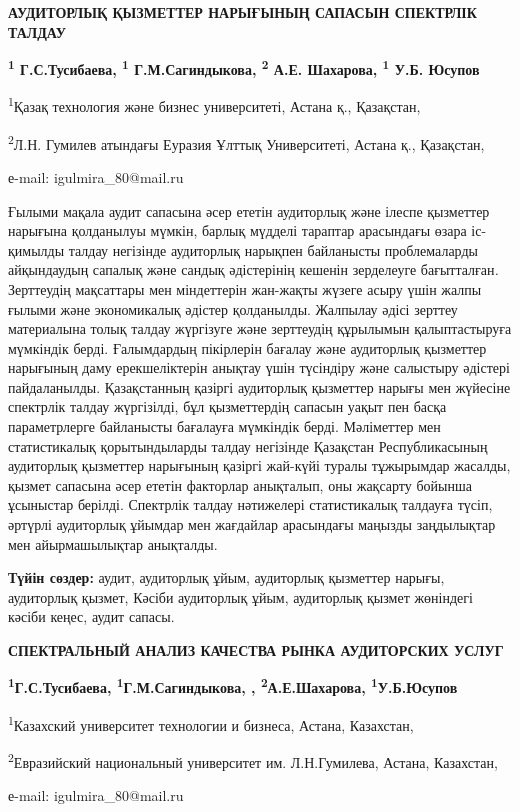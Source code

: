 \begin{articleheader}

{\bfseries АУДИТОРЛЫҚ ҚЫЗМЕТТЕР НАРЫҒЫНЫҢ САПАСЫН СПЕКТРЛІК ТАЛДАУ}

{\bfseries \textsuperscript{1} Г.С.Тусибаева\textsuperscript{\envelope},
\textsuperscript{1} Г.М.Сагиндыкова, \textsuperscript{2} А.Е. Шахарова,
\textsuperscript{1} У.Б. Юсупов}
\end{articleheader}
\begin{affiliation}

\textsuperscript{1}Қазақ технология және бизнес университеті, Астана қ.,
Қазақстан,

\textsuperscript{2}Л.Н. Гумилев атындағы Еуразия Ұлттық Университеті,
Астана қ., Қазақстан,

е-mail: igulmira\_80@mail.ru
\end{affiliation}

Ғылыми мақала аудит сапасына әсер ететін аудиторлық және ілеспе
қызметтер нарығына қолданылуы мүмкін, барлық мүдделі тараптар арасындағы
өзара іс-қимылды талдау негізінде аудиторлық нарықпен байланысты
проблемаларды айқындаудың сапалық және сандық әдістерінің кешенін
зерделеуге бағытталған\emph{.} Зерттеудің мақсаттары мен міндеттерін
жан-жақты жүзеге асыру үшін жалпы ғылыми және экономикалық әдістер
қолданылды. Жалпылау әдісі зерттеу материалына толық талдау жүргізуге
және зерттеудің құрылымын қалыптастыруға мүмкіндік берді. Ғалымдардың
пікірлерін бағалау және аудиторлық қызметтер нарығының даму
ерекшеліктерін анықтау үшін түсіндіру және салыстыру әдістері
пайдаланылды. Қазақстанның қазіргі аудиторлық қызметтер нарығы мен
жүйесіне спектрлік талдау жүргізілді, бұл қызметтердің сапасын уақыт пен
басқа параметрлерге байланысты бағалауға мүмкіндік берді. Мәліметтер мен
статистикалық қорытындыларды талдау негізінде Қазақстан Республикасының
аудиторлық қызметтер нарығының қазіргі жай-күйі туралы тұжырымдар
жасалды, қызмет сапасына әсер ететін факторлар анықталып, оны жақсарту
бойынша ұсыныстар берілді. Спектрлік талдау нәтижелері статистикалық
талдауға түсіп, әртүрлі аудиторлық ұйымдар мен жағдайлар арасындағы
маңызды заңдылықтар мен айырмашылықтар анықталды.

\textbf{Түйін сөздер:} аудит, аудиторлық ұйым, аудиторлық қызметтер
нарығы, аудиторлық қызмет, Кәсіби аудиторлық ұйым, аудиторлық қызмет
жөніндегі кәсіби кеңес, аудит сапасы.

\begin{articleheader}

{\bfseries СПЕКТРАЛЬНЫЙ АНАЛИЗ КАЧЕСТВА РЫНКА АУДИТОРСКИХ УСЛУГ}

{\bfseries \textsuperscript{1}Г.С.Тусибаева\textsuperscript{\envelope},
\textsuperscript{1}Г.М.Сагиндыкова, , \textsuperscript{2}А.Е.Шахарова,
\textsuperscript{1}У.Б.Юсупов}
\end{articleheader}
\begin{affiliation}

\textsuperscript{1}Казахский университет технологии и бизнеса, Астана,
Казахстан,

\textsuperscript{2}Евразийский национальный университет им.
Л.Н.Гумилева, Астана, Казахстан,

е-mail: igulmira\_80@mail.ru
\end{affiliation}

